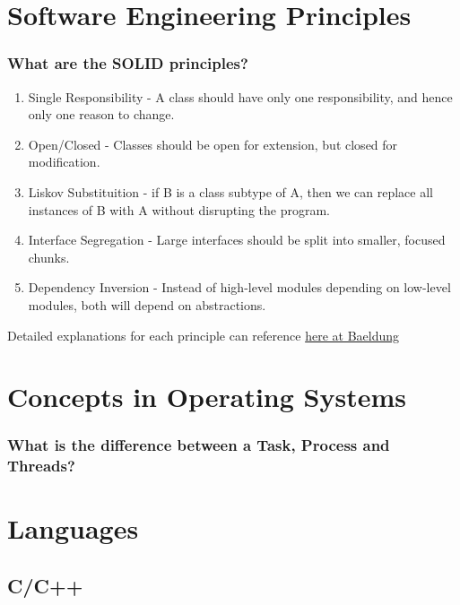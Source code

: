 \documentclass[12pt, a4paper]{article}
\begin{document}
\noindent

\tableofcontents

\pagebreak

\section*{Software Engineering Principles}

\subsubsection*{What are the SOLID principles?}
\begin{enumerate}
  \item Single Responsibility - A class should have only one responsibility, and hence only one reason to change.
  \item Open/Closed - Classes should be open for extension, but closed for modification.
  \item Liskov Substituition - if B is a class subtype of A, then we can replace all instances of B with A without disrupting the program.
  \item Interface Segregation - Large interfaces should be split into smaller, focused chunks.
  \item Dependency Inversion - Instead of high-level modules depending on low-level modules, both will depend on abstractions.
\end{enumerate}

Detailed explanations for each principle can reference \href{https://www.baeldung.com/solid-principles}{here at Baeldung}

\pagebreak
\section*{Concepts in Operating Systems}
\subsubsection*{What is the difference between a Task, Process and Threads?}


\pagebreak
\section*{Languages}

\subsection*{C/C++}
\end{document}
